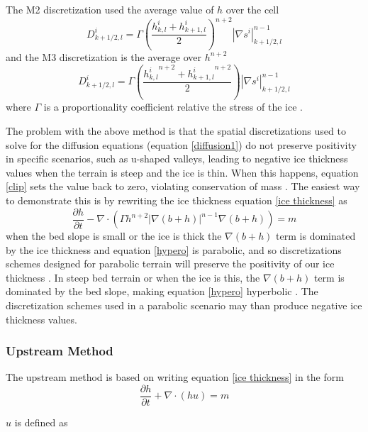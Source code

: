 \documentclass{article}
\begin{document}
The M2 discretization used the average value of $h$ over the cell
\begin{equation} \label{M2}
    D^i_{k+1/2,l}=\Gamma\left(\frac{h^i_{k,l}+h^i_{k+1,l}}{2}\right)^{n+2}|\nabla s ^i|^{n-1}_{k+1/2,l}
\end{equation}
and the M3 discretization is the average over $h^{n+2}$
\begin{equation} \label{M3}
    D^i_{k+1/2,l}=\Gamma\left(\frac{{h^i_{k,l}}^{n+2}+{h^i_{k+1,l}}^{n+2}}{2}\right)|\nabla s ^i|^{n-1}_{k+1/2,l}
\end{equation}
where $\Gamma$ is a proportionality coefficient relative the stress of the ice \citep{Jarosch2013}. 

The problem with the above method is that the spatial discretizations used to solve for the diffusion equations (equation \ref{diffusion1}) do not preserve positivity in specific scenarios, such as u-shaped valleys, leading to negative ice thickness values when the terrain is steep and the ice is thin. When this happens, equation \ref{clip} sets the value back to zero, violating conservation of mass \citep{Jarosch2013, Hindmarsh1996}. The easiest way to demonstrate this is by rewriting the ice thickness equation \ref{ice thickness} as
\begin{equation}\label{hypero}
\frac{\partial h}{\partial t} - \nabla \cdot \left( \Gamma h^{n+2} |\nabla(b+h)|^{n-1}\nabla(b+h)\right) =m
\end{equation}
when the bed slope is small or the ice is thick the  $\nabla(b+h)$ term is dominated by the ice thickness and equation \ref{hypero} is parabolic, and so discretizations schemes designed for parabolic terrain will preserve the positivity of our ice thickness \cite{Jarosch2013}. In steep bed terrain or when the ice is this, the $\nabla(b+h)$ term is dominated by the bed slope, making equation \ref{hypero} hyperbolic \cite{Jarosch2013}. The discretization schemes used in a parabolic scenario may than produce negative ice thickness values.
\subsubsection{Upstream Method}
The upstream method is based on writing equation \ref{ice thickness} in the form
\begin{equation} \label{upstream}
    \frac{\partial h}{\partial t} + \nabla \cdot (h u) = m
\end{equation}

$u$ is defined as
\end{document}
